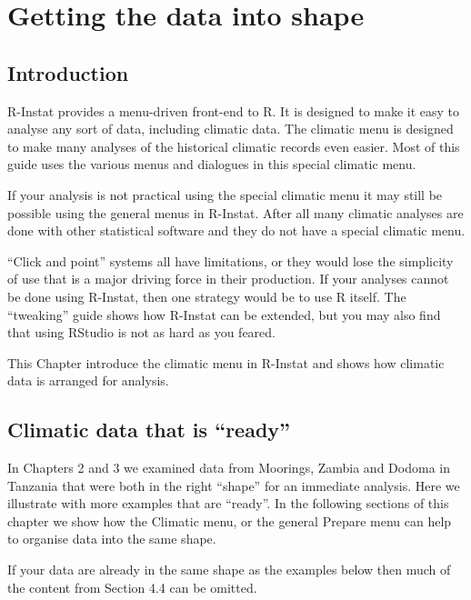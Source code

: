 \documentclass[
  letterpaper,
  DIV=11,
  numbers=noendperiod]{scrreprt}
\begin{document}

\chapter{Getting the data into shape}\label{getting-the-data-into-shape}

\section{Introduction}\label{introduction-2}

R-Instat provides a menu-driven front-end to R. It is designed to make
it easy to analyse any sort of data, including climatic data. The
climatic menu is designed to make many analyses of the historical
climatic records even easier. Most of this guide uses the various menus
and dialogues in this special climatic menu.

If your analysis is not practical using the special climatic menu it may
still be possible using the general menus in R-Instat. After all many
climatic analyses are done with other statistical software and they do
not have a special climatic menu.

``Click and point'' systems all have limitations, or they would lose the
simplicity of use that is a major driving force in their production. If
your analyses cannot be done using R-Instat, then one strategy would be
to use R itself. The ``tweaking'' guide shows how R-Instat can be
extended, but you may also find that using RStudio is not as hard as you
feared.

This Chapter introduce the climatic menu in R-Instat and shows how
climatic data is arranged for analysis.

\section{Climatic data that is
``ready''}\label{climatic-data-that-is-ready}

In Chapters 2 and 3 we examined data from Moorings, Zambia and Dodoma in
Tanzania that were both in the right ``shape'' for an immediate
analysis. Here we illustrate with more examples that are ``ready''. In
the following sections of this chapter we show how the Climatic menu, or
the general Prepare menu can help to organise data into the same shape.

If your data are already in the same shape as the examples below then
much of the content from Section 4.4 can be omitted.
\end{document}
